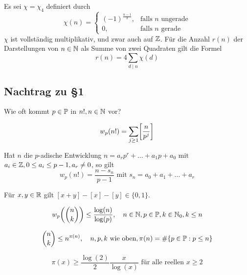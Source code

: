\begin{satz} \label{satz_8.2}
	Es sei $\chi = \chi_4$ definiert durch
	\[ \chi(n) = \begin{cases}
		(-1)^{\frac{n-1}{2}}, & \text{falls } n \text{ ungerade} \\
		0, & \text{falls } n \text{ gerade}
	\end{cases} \]
	$\chi$ ist vollständig multiplikativ, und zwar auch auf $\mathbb{Z}$. Für die Anzahl $r(n)$ der Darstellungen von $n \in \mathbb{N}$ als Summe von zwei Quadraten gilt die Formel
	\[ r(n) = 4 \sum\limits_{d \mid n} \chi(d) \]
\end{satz}

\subsection{Nachtrag zu §1}
Wie oft kommt $p \in \mathbb{P}$ in $n!, n\in \mathbb{N}$ vor?
\setcounter{countfalko}{8}
\begin{falko} 
	\[ w_p(n!) = \sum\limits_{j \geq 1} \benbrace*{\frac{n}{p^j}} \]
\end{falko}

	Hat $n$ die $p$-adische Entwicklung $n = a_r p^r + \dots + a_1p + a_0$ mit $a_i \in \mathbb{Z}, 0 \leq a_i \leq p-1, a_r \neq 0$, so gilt
	\[ w_p(n!) = \frac{n - s_n}{p-1} \text{ mit } s_n = a_0 + a_1 + \dots + a_r \]
	
\begin{lemma}
	Für $x,y \in \mathbb{R}$ gilt $[x+y] - [x] - [y] \in \{0,1\}$.
\end{lemma}

\begin{falko} \label{F8.10}
	\[ w_p\enbrace*{ \binom{n}{k}} \leq \frac{\log(n)}{\log(p)}, \quad n \in \NN, p \in \PP, k \in \NN_0, k \leq n \]
\end{falko}

\begin{falko} \label{F8.11}
	\[ \binom{n}{k} \leq n^{\pi(n)}, \quad n,p,k \text{ wie oben}, \pi(n) = \#\{p \in \mathbb{P} : p \leq n\} \]
\end{falko}

\begin{falko} \label{F8.12}
	\[ \pi(x) \geq \frac{\log(2)}{2} \frac{x}{\log(x)} \text{ für alle reellen } x \geq 2\]
\end{falko}
\newpage